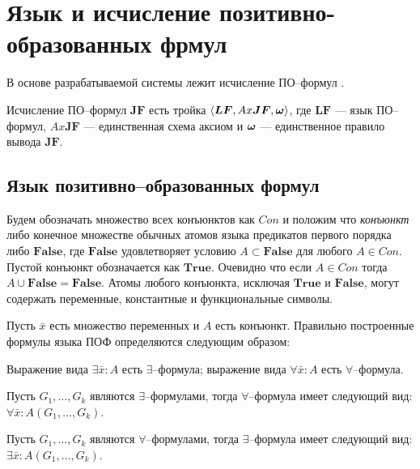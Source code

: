 
\section{Язык и исчисление позитивно-образованных фрмул}

В основе разрабатываемой системы лежит исчисление ПО--формул \cite{ICDS2000, DavydovX}.

Исчисление ПО--формул $\boldsymbol{JF}$ есть тройка $\left\langle \boldsymbol{LF}, Ax\boldsymbol{JF}, \boldsymbol{\omega} \right\rangle$, где $\boldsymbol{LF}$ --- язык ПО--формул, $Ax\boldsymbol{JF}$ --- единственная схема аксиом и $\boldsymbol{\omega}$ --- единственное правило вывода $\boldsymbol{JF}.$

\subsection{Язык позитивно--образованных формул}

Будем обозначать множество всех конъюнктов как $Con$ и положим что {\em конъюнкт} либо конечное множестве обычных атомов языка предикатов первого порядка либо $\boldsymbol{False}$, где $\boldsymbol{False}$ удовлетворяет условию $A \subset \boldsymbol{False} $ для любого $A \in Con$. Пустой конъюнкт обозначается как $\boldsymbol{True}$. Очевидно что если $A \in Con$ тогда $A \cup \boldsymbol{False} = \boldsymbol{False}$. Атомы любого конъюнкта, исключая $\boldsymbol{True}$ и $\boldsymbol{False}$, могут содержать переменные, константные и функциональные символы.

\begin{definition}\label{def:1}
Пусть $\bar{x}$ есть множество переменных и $A$ есть конъюнкт. Правильно построенные формулы языка ПОФ определяются следующим образом:

Выражение вида $\exists \bar{x}\colon A$ есть $\exists$--формула; выражение вида $\forall \bar{x}\colon A$ есть $\forall$--формула.

Пусть $G_1,\ldots,G_k$ являются $\exists$--формулами, тогда $\forall$--формула имеет следующий вид: $\forall \bar{x}\colon A\left(G_1,\ldots,G_k\right)$.

Пусть $G_1,\ldots,G_k$ являются $\forall$--формулами, тогда $\exists$--формула имеет следующий вид: $\exists \bar{x}\colon A\left(G_1,\ldots,G_k\right)$.

\end{definition}

